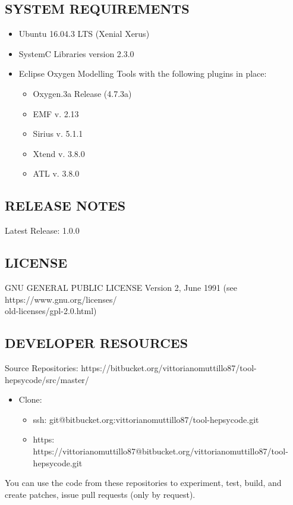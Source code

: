 \begin{appendices}
\subsection{SYSTEM REQUIREMENTS}
%
\begin{itemize}
    \item Ubuntu 16.04.3 LTS (Xenial Xerus)
    \item SystemC Libraries version 2.3.0
    \item Eclipse Oxygen Modelling Tools with the following plugins in place:
    \begin{itemize}
        \item Oxygen.3a Release (4.7.3a)
        \item EMF v. 2.13
        \item Sirius v. 5.1.1
        \item Xtend v. 3.8.0
        \item ATL v. 3.8.0
    \end{itemize}
\end{itemize}
%
\subsection{RELEASE NOTES}
%
Latest Release: 1.0.0
%
\subsection{LICENSE}
%
GNU GENERAL PUBLIC LICENSE Version 2, June 1991 (see https://www.gnu.org/licenses/ \\ old-licenses/gpl-2.0.html)
%
\subsection{DEVELOPER RESOURCES}
%
Source Repositories: https://bitbucket.org/vittorianomuttillo87/tool-hepsycode/src/master/
%
\begin{itemize}
    \item Clone:
    \begin{itemize}
        \item ssh: git@bitbucket.org:vittorianomuttillo87/tool-hepsycode.git
        \item https: https://vittorianomuttillo87@bitbucket.org/vittorianomuttillo87/tool-hepsycode.git
    \end{itemize}
\end{itemize}
%
You can use the code from these repositories to experiment, test, build, and create patches, issue pull requests (only by request).
%

\end{appendices}
